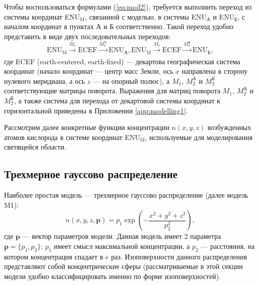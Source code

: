 \documentclass[12pt,a4paper]{article}
\renewcommand{\vec}{\mathbf}
\begin{document}
Чтобы воспользоваться формулами (\ref{eq:mod2}), требуется выполнить переход из системы координат ENU$_\text{M}$, связанной с моделью, в системы ENU$_\text{А}$ и ENU$_\text{Б}$, с началом координат в пунктах А и Б соответственно. Такой переход удобно представить в виде двух последовательных переходов:
 \begin{equation}\label{eq:mod5}
 \text{ENU}_\text{M} \xrightarrow[]{M_1} \text{ECEF} \xrightarrow[]{M_2^\text{А}} \text{ENU}_\text{А}, \text{ENU}_\text{M} \xrightarrow[]{M_1} \text{ECEF} \xrightarrow[]{M_2^\text{Б}} \text{ENU}_\text{Б}, 
 \end{equation}
где ECEF (earth-centered, earth-fixed) --- декартова географическая система координат (начало координат --- центр масс Земли, ось $x$ направлена в сторону нулевого меридиана, а ось $z$ --- на опорный полюс), а $M_1$, $M_2^\text{А}$ и $M_2^\text{Б}$ соответствующие матрицы поворота.
Выражения для матриц поворота $M_1$, $M_2^\text{А}$ и $M_2^\text{Б}$, а также система для перехода от декартовой системы координат к горизонтальной приведены в Приложении \ref{app:modelling1}.

Рассмотрим далее конкретные функции концентрации $n(x,y,z)$ возбужденных атомов кислорода в системе координат ENU$_\text{M}$, используемые для моделирования светящейся области.

\subsection{Трехмерное гауссово распределение} \label{subsec:model1}

Наиболее простая модель --- трехмерное гауссово распределение (далее модель M1):
\begin{equation}\label{eq:gauss1}
n(x,y,z,\vec{p})=p_1 \exp{(-\frac{x^2+y^2+z^2}{p_2^2})},
\end{equation}
где $\vec{p}$ --- вектор параметров модели. Данная модель имеет 2 параметра $\vec{p}=\{p_1,p_2\}$: $p_1$ имеет смысл максимальной концентрации, а $p_2$ --- расстояния, на котором концентрация спадает в $e$ раз. Изоповерхности данного распределения представляют собой концентрические сферы (рассматриваемые в этой секции модели удобно классифицировать именно по форме изоповерхностей). 
\end{document}

